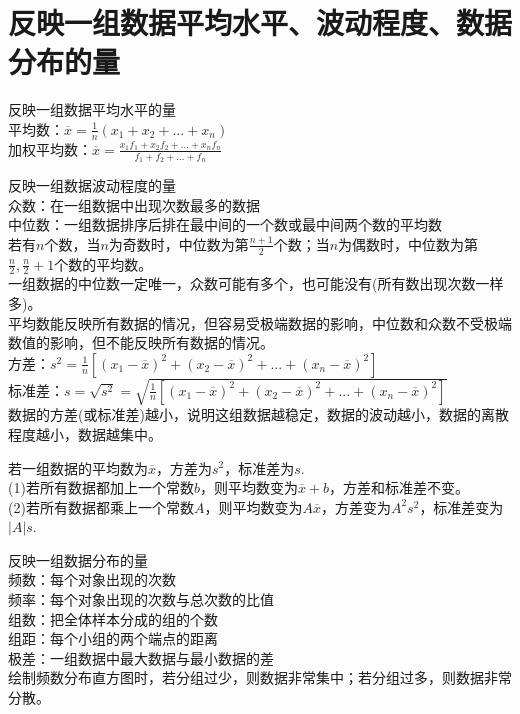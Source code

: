 \documentclass{ecnuthesis}
\begin{document}
\section{反映一组数据平均水平、波动程度、数据分布的量}
\begin{knowledge}
    反映一组数据平均水平的量 \\
    平均数：$\overline x = \frac{1}{n}(x_1+x_2+...+x_n)$ \\
    加权平均数：$\overline x=\frac{x_1f_1+x_2f_2+...+x_nf_n}{f_1+f_2+...+f_n}$
\end{knowledge}
\begin{knowledge}
    反映一组数据波动程度的量 \\
    众数：在一组数据中出现次数最多的数据 \\
    中位数：一组数据排序后排在最中间的一个数或最中间两个数的平均数 \\
    若有$n$个数，当$n$为奇数时，中位数为第$\frac{n+1}{2}$个数；当$n$为偶数时，中位数为第$\frac{n}{2},\frac{n}{2}+1$个数的平均数。\\
    一组数据的中位数一定唯一，众数可能有多个，也可能没有(所有数出现次数一样多)。\\
    平均数能反映所有数据的情况，但容易受极端数据的影响，中位数和众数不受极端数值的影响，但不能反映所有数据的情况。\\
    方差：$s^2=\frac{1}{n}[(x_1-\overline x)^2+(x_2-\overline x)^2+...+(x_n-\overline x)^2]$ \\
    标准差：$s=\sqrt{s^2}=\sqrt{\frac{1}{n}[(x_1-\overline x)^2+(x_2-\overline x)^2+...+(x_n-\overline x)^2]}$ \\
    数据的方差(或标准差)越小，说明这组数据越稳定，数据的波动越小，数据的离散程度越小，数据越集中。
\end{knowledge}
\begin{knowledge}
    若一组数据的平均数为$\overline x$，方差为$s^2$，标准差为$s$. \\
    (1)若所有数据都加上一个常数$b$，则平均数变为$\overline x+b$，方差和标准差不变。 \\
    (2)若所有数据都乘上一个常数$A$，则平均数变为$A\overline x$，方差变为$A^2s^2$，标准差变为$|A|s$.
\end{knowledge}
\begin{knowledge}
    反映一组数据分布的量 \\
    频数：每个对象出现的次数 \\
    频率：每个对象出现的次数与总次数的比值  \\
    组数：把全体样本分成的组的个数 \\
    组距：每个小组的两个端点的距离 \\
    极差：一组数据中最大数据与最小数据的差 \\
    绘制频数分布直方图时，若分组过少，则数据非常集中；若分组过多，则数据非常分散。
\end{knowledge}
\end{document}
